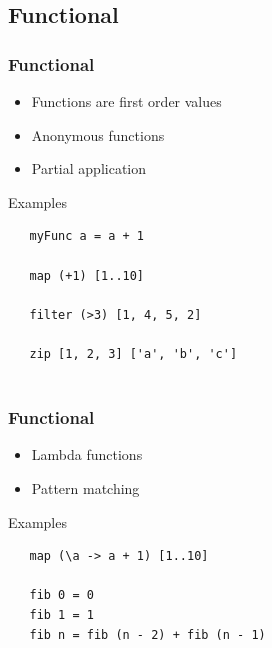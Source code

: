 \documentclass{beamer}
\begin{document}
\subsection{Functional}
\begin{frame}[fragile]
\frametitle{Functional}

 \begin{itemize}
  \item Functions are first order values
  \item Anonymous functions
  \item Partial application
 \end{itemize}

 \vspace{0.5cm}
 \begin{block}{Examples}
  \begin{lstlisting} 
   myFunc a = a + 1
  
   map (+1) [1..10]
  
   filter (>3) [1, 4, 5, 2]
  
   zip [1, 2, 3] ['a', 'b', 'c']
  
  \end{lstlisting}
 \end{block}

\end{frame}

\begin{frame}[fragile]
\frametitle{Functional}
 
 \begin{itemize}
  \item Lambda functions
  \item Pattern matching	  
 \end{itemize}

 \vspace{0.5cm}
 \begin{block}{Examples}

  \begin{lstlisting} 
   map (\a -> a + 1) [1..10]
  
   fib 0 = 0
   fib 1 = 1
   fib n = fib (n - 2) + fib (n - 1)
  
  \end{lstlisting}
 \end{block}

\end{frame}
\end{document}
